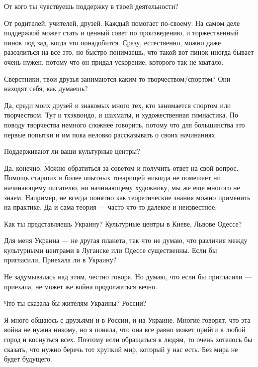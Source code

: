 От кого ты чувствуешь поддержку в твоей деятельности?

От родителей, учителей, друзей. Каждый помогает по-своему. На самом деле
поддержкой может стать и ценный совет по произведению, и торжественный пинок
под зад, когда это понадобится. Сразу, естественно, можно даже разозлиться на
все это, но быстро понимаешь, что такой вот пинок иногда бывает очень нужен,
потому что он придал ускорение, которого так не хватало.

Сверстники, твои друзья занимаются каким-то творчеством/спортом? Они находят себя, как думаешь?

Да, среди моих друзей и знакомых много тех, кто занимается спортом или
творчеством. Тут и тхэквондо, и шахматы, и художественная гимнастика. По поводу
творчества немного сложнее говорить, потому что для большинства это первые
попытки и им пока неловко рассказывать о своих начинаниях.

Поддерживают ли ваши культурные центры?

Да, конечно. Можно обратиться за советом и получить ответ на свой вопрос.
Помощь старших и более опытных товарищей никогда не помешает ни начинающему
писателю, ни начинающему художнику, мы же еще многого не знаем. Например, не
всегда понятно как теоретические знания можно применить на практике. Да и сама
теория --- часто что-то далекое и неизвестное.

Как ты представляешь Украину? Культурные центры в Киеве, Львове Одессе?

Для меня Украина --- не другая планета, так что не думаю, что различия между культурными центрами в Луганске или Одессе существенны.
Если бы пригласили, Приехала ли в Украину?

Не задумывалась над этим, честно говоря. Но думаю, что если бы пригласили --- приехала, не может же война продолжаться вечно.

Что ты сказала бы жителям Украины? России?

Я много общаюсь с друзьями и в России, и на Украине. Многие говорят, что эта
война не нужна никому, но я поняла, что она все равно может прийти в любой
город и коснуться всех. Поэтому если обращаться к людям, то очень хотелось бы
сказать, что нужно беречь тот хрупкий мир, который у нас есть. Без мира не
будет будущего.
